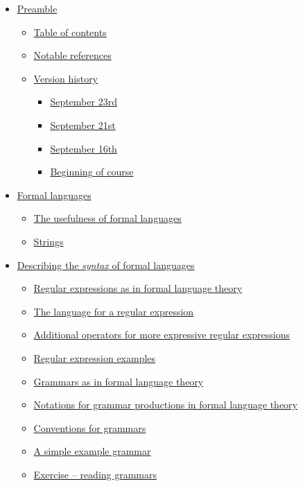 \documentclass[11pt]{article}
\theoremstyle{definition}
\begin{document}
\begin{scriptsize}
\begin{itemize}
\item \hyperref[sec:orgc8be8c3]{Preamble}
\begin{itemize}
\item \hyperref[sec:orge311e4f]{Table of contents}
\item \hyperref[sec:org1c87796]{Notable references}
\item \hyperref[sec:orgffed929]{Version history}
\begin{itemize}
\item \hyperref[sec:orgd6a7840]{September 23rd}
\item \hyperref[sec:org309c1d6]{September 21st}
\item \hyperref[sec:org06f0419]{September 16th}
\item \hyperref[sec:org9541e3d]{Beginning of course}
\end{itemize}
\end{itemize}
\item \hyperref[sec:orge3162fa]{Formal languages}
\begin{itemize}
\item \hyperref[sec:org6284c09]{The usefulness of formal languages}
\item \hyperref[sec:org382e0c9]{Strings}
\end{itemize}
\item \hyperref[sec:org30490de]{Describing the \emph{syntax} of formal languages}
\begin{itemize}
\item \hyperref[sec:orgef114ec]{Regular expressions as in formal language theory}
\item \hyperref[sec:orgf0651a3]{The language for a regular expression}
\item \hyperref[sec:org869969e]{Additional operators for more expressive regular expressions}
\item \hyperref[sec:org353bdbc]{Regular expression examples}
\item \hyperref[sec:org118d6ea]{Grammars as in formal language theory}
\item \hyperref[sec:orgf396016]{Notations for grammar productions in formal language theory}
\item \hyperref[sec:orged8f2ad]{Conventions for grammars}
\item \hyperref[sec:org7130b52]{A simple example grammar}
\item \hyperref[sec:org68b8033]{Exercise – reading grammars}

\end{itemize}
\end{itemize}
\end{scriptsize}
\end{document}
